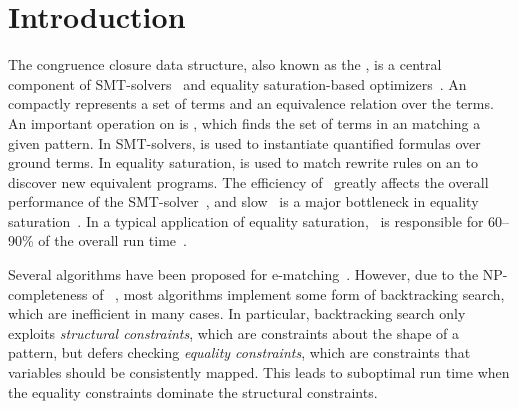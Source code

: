 \section{Introduction}

The congruence closure data structure,
 also known as the \egraph,
 is a central component of SMT-solvers~\cite{simplify, z3, moskal, cvc4}
 and equality saturation-based optimizers~\cite{eqsat, egg}.
An \egraph compactly represents a set of terms
 and an equivalence relation over the terms.
An important operation on \egraphs is \ematching,
 which finds the set of terms in an \egraph
 matching a given pattern.
In SMT-solvers, \ematching is used to instantiate
 quantified formulas over ground terms.
In equality saturation, \ematching is used
 to match rewrite rules on an \egraph
 to discover new equivalent programs.
The efficiency of \ematching~greatly affects the overall performance
 of the SMT-solver~\cite{z3, cvc4},
 and slow \ematching~is a major bottleneck
 in equality saturation~\cite{egg, tensat, szalinski}.
In a typical application of equality saturation,
 \ematching~is responsible for 60--90\% of the overall run time~\cite{egg}.

Several algorithms have been proposed for e-matching~\cite{efficient-ematching, moskal, simplify}.
However, due to the NP-completeness of \ematching~\cite{ematching-nph},
 most algorithms implement some form of backtracking search,
 which are inefficient in many cases.
In particular, backtracking search only exploits \textit{structural constraints},
 which are constraints about the shape of a pattern,
 but defers checking \textit{equality constraints},
 which are constraints that variables should be consistently mapped.
This leads to suboptimal run time when
 the equality constraints dominate the structural constraints.

